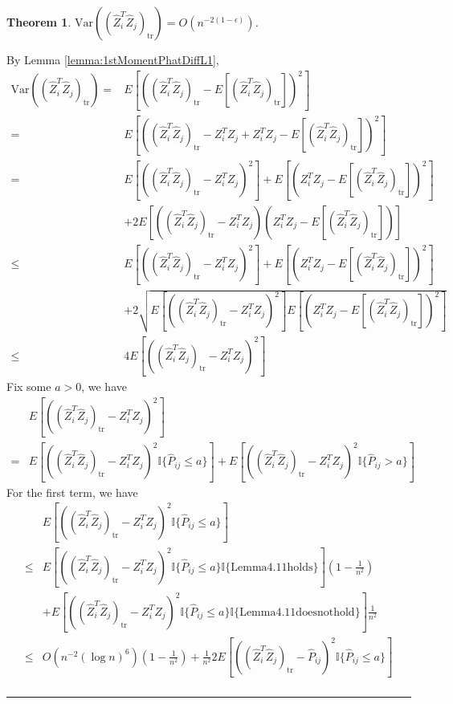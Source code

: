\documentclass[a4paper]{article}
\newenvironment{proof}{{\bf Proof:  }}{\hfill\rule{2mm}{2mm}}
\newtheorem{theorem}[fact]{Theorem}
\begin{document}
\begin{theorem}
\label{thm:VarASEL1}
$\mathrm{Var}((\hat{Z}_i^T \hat{Z}_j)_{\mathrm{tr}}) = O(n^{-2(1-\epsilon)})$.
\end{theorem}
\begin{proof}
By Lemma \ref{lemma:1stMomentPhatDiffL1},
\begin{align*}
	\mathrm{Var}((\hat{Z}_i^T \hat{Z}_j)_{\mathrm{tr}})
    = & E[((\hat{Z}_i^T \hat{Z}_j)_{\mathrm{tr}} - E[(\hat{Z}_i^T \hat{Z}_j)_{\mathrm{tr}}])^2] \\
    = & E[((\hat{Z}_i^T \hat{Z}_j)_{\mathrm{tr}} - Z_i^T Z_j + Z_i^T Z_j - E[(\hat{Z}_i^T \hat{Z}_j)_{\mathrm{tr}}])^2] \\
    = & E[((\hat{Z}_i^T \hat{Z}_j)_{\mathrm{tr}} - Z_i^T Z_j)^2] + E[(Z_i^T Z_j - E[(\hat{Z}_i^T \hat{Z}_j)_{\mathrm{tr}}])^2] \\ 
    & + 2E[((\hat{Z}_i^T \hat{Z}_j)_{\mathrm{tr}} - Z_i^T Z_j)(Z_i^T Z_j - E[(\hat{Z}_i^T \hat{Z}_j)_{\mathrm{tr}}])] \\
    \le & E[((\hat{Z}_i^T \hat{Z}_j)_{\mathrm{tr}} - Z_i^T Z_j)^2] + E[(Z_i^T Z_j - E[(\hat{Z}_i^T \hat{Z}_j)_{\mathrm{tr}}])^2] \\ 
    & + 2\sqrt{E[((\hat{Z}_i^T \hat{Z}_j)_{\mathrm{tr}} - Z_i^T Z_j)^2] E[(Z_i^T Z_j - E[(\hat{Z}_i^T \hat{Z}_j)_{\mathrm{tr}}])^2]} \\
    \le & 4 E[((\hat{Z}_i^T \hat{Z}_j)_{\mathrm{tr}} - Z_i^T Z_j)^2]
\end{align*}
Fix some $a > 0$, we have
\begin{align*}
	& E[((\hat{Z}_i^T \hat{Z}_j)_{\mathrm{tr}} - Z_i^T Z_j)^2] \\
	= & E[((\hat{Z}_i^T \hat{Z}_j)_{\mathrm{tr}} - Z_i^T Z_j)^2 \mathbb{I}\{\hat{P}_{ij} \le a\}]
	+ E[((\hat{Z}_i^T \hat{Z}_j)_{\mathrm{tr}} - Z_i^T Z_j)^2 \mathbb{I}\{\hat{P}_{ij} > a\}]
\end{align*}
For the first term, we have
\begin{align*}
	& E[((\hat{Z}_i^T \hat{Z}_j)_{\mathrm{tr}} - Z_i^T Z_j)^2 \mathbb{I}\{\hat{P}_{ij} \le a\}] \\
	\le & E[((\hat{Z}_i^T \hat{Z}_j)_{\mathrm{tr}} - Z_i^T Z_j)^2 \mathbb{I}\{\hat{P}_{ij} \le a\} \mathbb{I}\{\mathrm{Lemma 4.11 holds}\}] (1 - \frac{1}{n^2}) \\
	& + E[((\hat{Z}_i^T \hat{Z}_j)_{\mathrm{tr}} - Z_i^T Z_j)^2 \mathbb{I}\{\hat{P}_{ij} \le a\} \mathbb{I}\{\mathrm{Lemma 4.11 does not hold}\}] \frac{1}{n^2} \\
	\le & O(n^{-2} (\log n)^6) (1 - \frac{1}{n^2}) + \frac{1}{n^2} 2 E[((\hat{Z}_i^T \hat{Z}_j)_{\mathrm{tr}} - \hat{P}_{ij})^2 \mathbb{I}\{\hat{P}_{ij} \le a\}] \\

\end{align*}
\end{proof}
\end{document}
